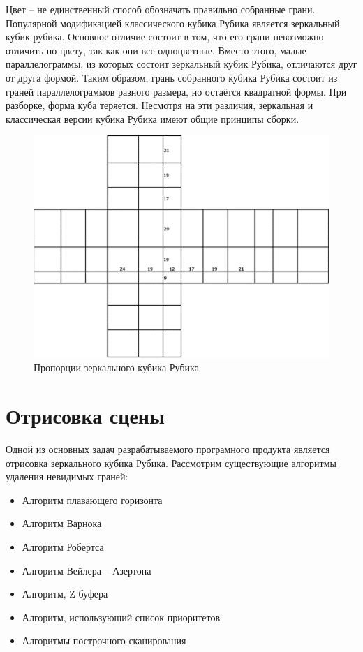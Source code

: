 \documentclass[a4paper, 14pt]{report} %
\begin{document}
	Цвет – не единственный способ обозначать правильно собранные грани. Популярной модификацией классического кубика Рубика является зеркальный кубик рубика. Основное отличие состоит в том, что его грани невозможно отличить по цвету, так как они все одноцветные. Вместо этого, малые параллелограммы, из которых состоит зеркальный кубик Рубика, отличаются друг от друга формой. Таким образом, грань собранного кубика Рубика состоит из граней параллелограммов разного размера, но остаётся квадратной формы. При разборке, форма куба теряется. Несмотря на эти различия, зеркальная и классическая версии кубика Рубика имеют общие принципы сборки.
	
	\begin{figure}[ht]
		\centering
		\includegraphics{mirrored_cube_propotions.png}
		\caption{Пропорции зеркального кубика Рубика}
		\label{fig:mirrored_cube_proportions}
	\end{figure}

	\section{Отрисовка сцены}
	Одной из основных задач разрабатываемого програмного продукта является отрисовка зеркального кубика Рубика. Рассмотрим существующие алгоритмы удаления невидимых граней:
	\begin{itemize}
		\item Алгоритм плавающего горизонта
		\item Алгоритм Варнока
		\item Алгоритм Робертса
		\item Алгоритм Вейлера – Азертона
		\item Алгоритм, Z-буфера
		\item Алгоритм, использующий список приоритетов
		\item Алгоритмы построчного сканирования
	\end{itemize}
\end{document}
